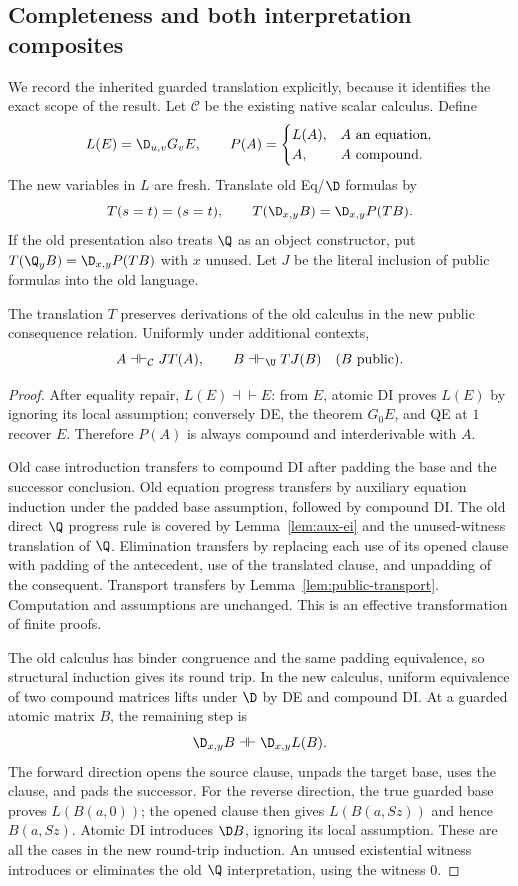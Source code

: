 \subsection{Completeness and both interpretation composites}

We record the inherited guarded translation explicitly, because it
identifies the exact scope of the result.  Let $\mathcal C$ be the
existing native scalar calculus.  Define
\[
 L(E)=\D_{u,v}G_vE,\qquad
 P(A)=\begin{cases}L(A),&A\text{ an equation},\\A,&A\text{ compound}.
 \end{cases}
\]
The new variables in $L$ are fresh.  Translate old Eq/$\D$ formulas by
\[
 T(s=t)=(s=t),\qquad
 T(\D_{x,y}B)=\D_{x,y}P(TB).
\]
If the old presentation also treats $\Q$ as an object constructor, put
$T(\Q_yB)=\D_{x,y}P(TB)$ with $x$ unused.  Let $J$ be the literal
inclusion of public formulas into the old language.

\begin{lemma}\label{lem:guarded-composites}
The translation $T$ preserves derivations of the old calculus in the new
public consequence relation.  Uniformly under additional contexts,
\[
 A\dashv\vdash_{\mathcal C}JT(A),\qquad
 B\dashv\vdash_{\U}TJ(B)\quad(B\text{ public}).
\]
\end{lemma}
\begin{proof}
After equality repair, $L(E)\dashv\vdash E$: from $E$, atomic DI
proves $L(E)$ by ignoring its local assumption; conversely DE, the
theorem $G_0E$, and QE at $1$ recover $E$.  Therefore $P(A)$ is
always compound and interderivable with $A$.

Old case introduction transfers to compound DI after padding the base
and the successor conclusion.  Old equation progress transfers by
auxiliary equation induction under the padded base assumption, followed
by compound DI.  The old direct $\Q$ progress rule is covered by
Lemma~\ref{lem:aux-ei} and the unused-witness translation of $\Q$.
Elimination transfers by replacing each use of its opened clause with
padding of the antecedent, use of the translated clause, and unpadding
of the consequent.  Transport transfers by
Lemma~\ref{lem:public-transport}.  Computation and assumptions are
unchanged.  This is an effective transformation of finite proofs.

The old calculus has binder congruence and the same padding equivalence,
so structural induction gives its round trip.  In the new calculus,
uniform equivalence of two compound matrices lifts under $\D$ by DE
and compound DI.  At a guarded atomic matrix $B$, the remaining step is
\[
 \D_{x,y}B\dashv\vdash\D_{x,y}L(B).
\]
The forward direction opens the source clause, unpads the target base,
uses the clause, and pads the successor.  For the reverse direction,
the true guarded base proves $L(B(a,0))$; the opened clause then gives
$L(B(a,Sz))$ and hence $B(a,Sz)$.  Atomic DI introduces $\D B$,
ignoring its local assumption.  These are all the cases in the new
round-trip induction.  An unused existential witness introduces or
eliminates the old $\Q$ interpretation, using the witness $0$.
\end{proof}

